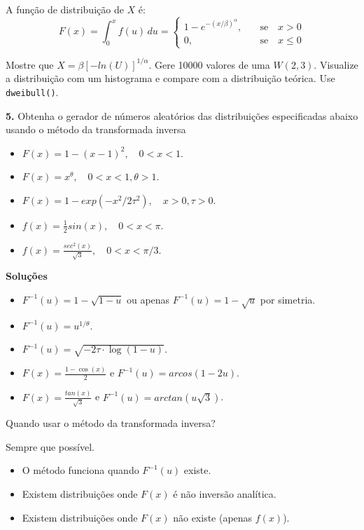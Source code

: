\documentclass[
]{book}
\begin{document}
A função de distribuição de \(X\) é:
\[F(x) = \int_{0}^{x}f(u)\, du = \begin{cases}
1-e^{-(x/\beta)^\alpha},& \quad \text{se} \quad x>0\\
0,& \quad \text{se} \quad x\leq 0
\end{cases}\]

Mostre que \(X = \beta[-ln(U)]^{1/\alpha}\). Gere 10000 valores de uma
\(W(2,3)\). Visualize a distribuição com um histograma e compare com a distribuição teórica. Use \texttt{dweibull()}.

\textbf{5.} Obtenha o gerador de números aleatórios das distribuições
especificadas abaixo usando o método da transformada inversa

\begin{itemize}
\item
  \(F(x) = 1-(x-1)^2, \quad 0<x<1\).
\item
  \(F(x) = x^{\theta}, \quad 0<x<1, \theta>1\).
\item
  \(F(x) = 1-exp(-x^2/2\tau^2), \quad x>0, \tau>0\).
\item
  \(f(x) = \frac{1}{2}sin(x), \quad 0<x<\pi\).
\item
  \(f(x) = \frac{sec^2(x)}{\sqrt{3}}, \quad 0<x<\pi/3\).
\end{itemize}

\textbf{Soluções}

\begin{itemize}
\item
  \(F^{-1}(u) = 1-\sqrt{1-u}\) ou apenas \(F^{-1}(u)=1-\sqrt{u}\) por
  simetria.
\item
  \(F^{-1}(u) = u^{1/\theta}\).
\item
  \(F^{-1}(u) = \sqrt{-2\tau \cdot \log(1-u)}\).
\item
  \(F(x) = \frac{1-\cos(x)}{2}\) e \(F^{-1}(u)=arcos(1-2u)\).
\item
  \(F(x) = \frac{tan(x)}{\sqrt{3}}\) e \(F^{-1}(u) = arctan(u\sqrt3)\).
\end{itemize}

Quando usar o método da transformada inversa?

Sempre que possível.

\begin{itemize}
\item
  O método funciona quando \(F^{-1}(u)\) existe.
\item
  Existem distribuições onde \(F(x)\) é não inversão analítica.
\item
  Existem distribuições onde \(F(x)\) não existe (apenas \(f(x)\)).
\end{itemize}
\end{document}
